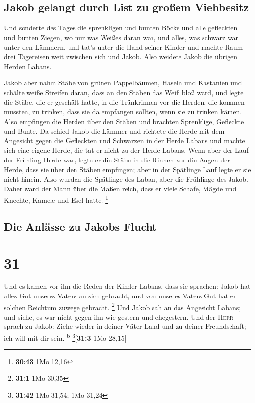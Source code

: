 \hypertarget{jakob-gelangt-durch-list-zu-grouxdfem-viehbesitz}{%
\subsection{Jakob gelangt durch List zu großem
Viehbesitz}\label{jakob-gelangt-durch-list-zu-grouxdfem-viehbesitz}}

 Und sonderte des Tages die sprenkligen und bunten Böcke
und alle gefleckten und bunten Ziegen, wo nur was Weißes daran war, und
alles, was schwarz war unter den Lämmern, und tat's unter die Hand
seiner Kinder  und machte Raum drei Tagereisen weit
zwischen sich und Jakob. Also weidete Jakob die übrigen Herden Labans.

 Jakob aber nahm Stäbe von grünen Pappelbäumen, Haseln
und Kastanien und schälte weiße Streifen daran, dass an den Stäben das
Weiß bloß ward,  und legte die Stäbe, die er geschält
hatte, in die Tränkrinnen vor die Herden, die kommen mussten, zu
trinken, dass sie da empfangen sollten, wenn sie zu trinken kämen.
 Also empfingen die Herden über den Stäben und brachten
Sprenklige, Gefleckte und Bunte.  Da schied Jakob die
Lämmer und richtete die Herde mit dem Angesicht gegen die Gefleckten und
Schwarzen in der Herde Labans und machte sich eine eigene Herde, die tat
er nicht zu der Herde Labans.  Wenn aber der Lauf der
Frühling-Herde war, legte er die Stäbe in die Rinnen vor die Augen der
Herde, dass sie über den Stäben empfingen;  aber in der
Spätlinge Lauf legte er sie nicht hinein. Also wurden die Spätlinge des
Laban, aber die Frühlinge des Jakob.  Daher ward der Mann
über die Maßen reich, dass er viele Schafe, Mägde und Knechte, Kamele
und Esel hatte. \footnote{\textbf{30:43} 1Mo 12,16}

\hypertarget{die-anluxe4sse-zu-jakobs-flucht}{%
\subsection{Die Anlässe zu Jakobs
Flucht}\label{die-anluxe4sse-zu-jakobs-flucht}}

\hypertarget{section-30}{%
\section{31}\label{section-30}}

 Und es kamen vor ihn die Reden der Kinder Labans, dass
sie sprachen: Jakob hat alles Gut unseres Vaters an sich gebracht, und
von unseres Vaters Gut hat er solchen Reichtum zuwege gebracht.
\footnote{\textbf{31:1} 1Mo 30,35}  Und Jakob sah an das
Angesicht Labans; und siehe, es war nicht gegen ihn wie gestern und
ehegestern.  Und der \textsc{Herr} sprach zu Jakob: Ziehe
wieder in deiner Väter Land und zu deiner Freundschaft; ich will mit dir
sein. \textsuperscript{b} \footnote{\textbf{31:42} 1Mo 31,54; 1Mo 31,24}{[}\textbf{31:3}
1Mo 28,15{]}

